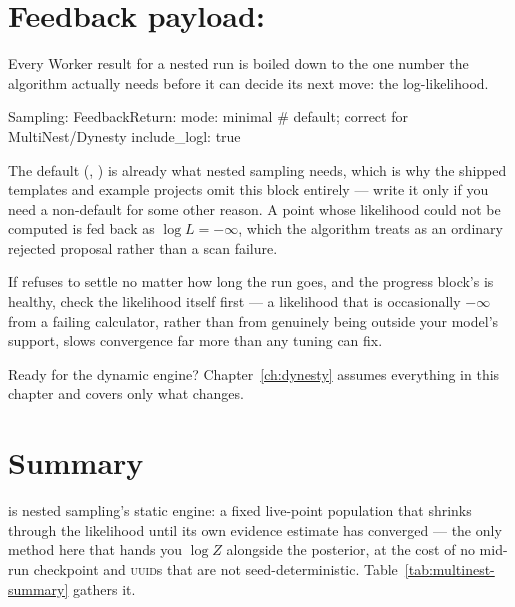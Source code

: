 \section{Feedback payload: }
\label{sec:nested-feedback-return}

Every Worker result for a nested run is boiled down to the one number the algorithm
actually needs before it can decide its next move: the log-likelihood.

\begin{yamlwin}
Sampling:
  FeedbackReturn:
    mode: minimal        # default; correct for MultiNest/Dynesty
    include_logl: true
\end{yamlwin}

The default (, ) is already what
nested sampling needs, which is why the shipped templates and example projects omit
this block entirely --- write it only if you need a non-default
 for some other reason. A point whose likelihood could not be
computed is fed back as $\log L = -\infty$, which the algorithm treats as an ordinary
rejected proposal rather than a scan failure.

\begin{jtip}
If  refuses to settle no matter how long the run goes, and the progress
block's  is healthy, check the likelihood itself first --- a likelihood
that is occasionally $-\infty$ from a failing calculator, rather than from genuinely
being outside your model's support, slows convergence far more than any
 tuning can fix.
\end{jtip}

\begin{jtip}
Ready for the dynamic engine? Chapter~\ref{ch:dynesty} assumes everything in this
chapter and covers only what changes.
\end{jtip}

\section{Summary}
\label{sec:multinest-summary}

 is nested sampling's static engine: a fixed live-point population
that shrinks through the likelihood until its own evidence estimate has converged ---
the only method here that hands you $\log Z$ alongside the posterior, at the cost of no
mid-run checkpoint and \textsc{uuid}s that are not seed-deterministic.
Table~\ref{tab:multinest-summary} gathers it.

